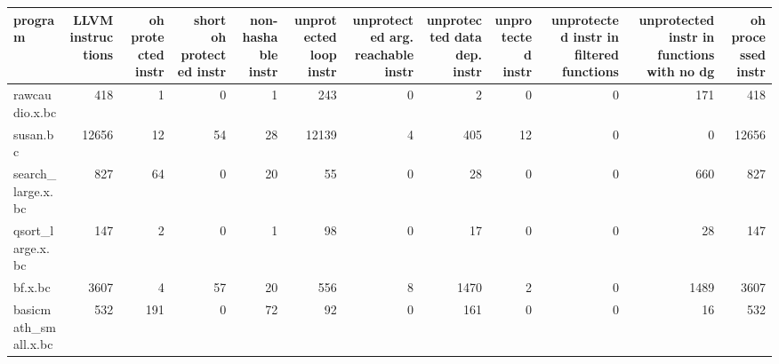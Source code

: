 \begin{table}[ht]
\centering
\begin{adjustbox}{width=1.3\textwidth}
\begin{tabular}{lrrrrrrrrrrr}
\hline
 program              &   LLVM instructions &   oh protected instr &   short oh protected instr &   non-hashable instr &   unprotected loop instr &   unprotected arg. reachable instr &   unprotected data dep. instr &   unprotected instr &   unprotected instr in filtered functions &   unprotected instr in functions with no dg &   oh processed instr \\
\hline
 rawcaudio.x.bc       &                 418 &                    1 &                          0 &                    1 &                      243 &                                  0 &                             2 &                   0 &                                         0 &                                         171 &                  418 \\
 susan.bc             &               12656 &                   12 &                         54 &                   28 &                    12139 &                                  4 &                           405 &                  12 &                                         0 &                                           0 &                12656 \\
 search\_large.x.bc    &                 827 &                   64 &                          0 &                   20 &                       55 &                                  0 &                            28 &                   0 &                                         0 &                                         660 &                  827 \\
 qsort\_large.x.bc     &                 147 &                    2 &                          0 &                    1 &                       98 &                                  0 &                            17 &                   0 &                                         0 &                                          28 &                  147 \\
 bf.x.bc              &                3607 &                    4 &                         57 &                   20 &                      556 &                                  8 &                          1470 &                   2 &                                         0 &                                        1489 &                 3607 \\
 basicmath\_small.x.bc &                 532 &                  191 &                          0 &                   72 &                       92 &                                  0 &                           161 &                   0 &                                         0 &                                          16 &                  532 \\

\end{tabular}
\end{adjustbox}
\end{table}
